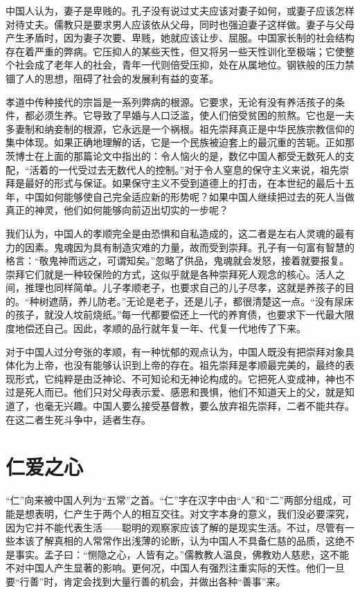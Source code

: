 \documentclass[12pt,oneside]{book}
\begin{document}
\begin{common-format}
中国人认为，妻子是卑贱的。孔子没有说过丈夫应该对妻子如何，或妻子应该怎样对待丈夫。儒教只是要求男人应该依从父母，同时也强迫妻子这样做。妻子与父母产生矛盾时，因为妻子次要、卑贱，她就应该让步、屈服。中国家长制的社会结构存在着严重的弊病。它压抑人的某些天性，但又将另一些天性训化至极端；它使整个社会成了老年人的社会，青年一代则倍受压抑，处在从属地位。钢铁般的压力禁锢了人的思想，阻碍了社会的发展利有益的变革。 

孝道中传种接代的宗旨是一系列弊病的根源。它要求，无论有没有养活孩子的条件，都必须生养。它导致了早婚与人口泛滥，使人们倍受贫困的煎熬。它也是一夫多妻制和纳妾制的根源，它永远是一个祸根。祖先崇拜真正是中华民族宗教信仰的集中体现。如果正确地理解的话，它是一个民族被迫套上的最沉重的苦轭。正如那茨博士在上面的那篇论文中指出的：令人恼火的是，数亿中国人都受无数死人的支配，“活着的一代受过去无数代人的控制。”对于令人窒息的保守主义来说，祖先崇拜是最好的形式与保证。如果保守主义不受到道德上的打击，在本世纪的最后十五年，中国如何能够使自己完全适应新的形势呢？如果中国人继续把过去的死人当做真正的神灵，他们如何能够向前迈出切实的一步呢？ 

我们认为，中国人的孝顺完全是由恐惧和自私造成的，这二者是左右人灵魂的最有力的因素。鬼魂因为具有制造灾难的力量，故而受到崇拜。孔子有一句富有智慧的格言：“敬鬼神而远之，可谓知矣。”忽略了供品，鬼魂就会发怒，接着就要报复。崇拜它们就是一种较保险的方式，这似乎就是各种崇拜死人观念的核心。活人之间，推理也同样简单。儿子孝顺老子，也要求自己的儿子尽孝，这就是养孩子的目的。“种树遮荫，养儿防老。”无论是老子，还是儿子，都很清楚这一点。“没有尿床的孩子，就没人坟前烧纸。”每一代都要偿还上一代的养育债，也要求下一代最大限度地偿还自己。因此，孝顺的品行就年复一年、代复一代地传了下来。 

对于中国人过分夸张的孝顺，有一种忧郁的观点认为，中国人既没有把崇拜对象具体化为上帝，也没有能够认识到上帝的存在。祖先崇拜是孝顺最完美的，最终的表现形式，它纯粹是由泛神论、不可知论和无神论构成的。它把死人变成神，神也不过是死人而已。他们只对父母表示爱、感恩和畏惧，他们不知道天上的父，就是知道了，也毫无兴趣。中国人要么接受基督教，要么放弃祖先崇拜，二者不能共存。在这二者生死斗争中，适者生存。



\chapter{仁爱之心}
“仁”向来被中国人列为“五常”之首。“仁”字在汉字中由“人”和“二”两部分组成，可能是想表明，仁产生于两个人的相互交往。对文字本身的意义，我们没必要深究，因为它并不能代表生活——聪明的观察家应该了解的是现实生活。不过，尽管有一些本该了解真相的人常常作出浅薄的论断，认为中国人不具备仁慈的品质，这绝不是事实。孟子曰：“恻隐之心，人皆有之。”儒教教人温良，佛教劝人慈悲，这不能不对中国人产生显著的影响。更何况，中国人有强烈注重实际的天性。他们一旦要“行善”时，肯定会找到大量行善的机会，并做出各种“善事”来。 


\end{common-format}
\end{document}

